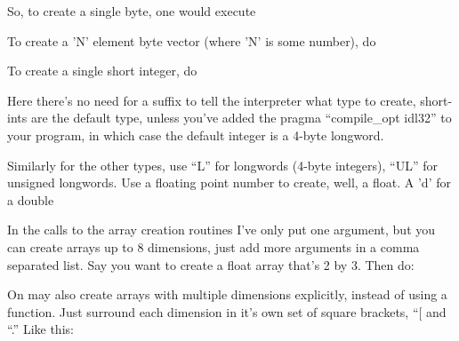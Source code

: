 







  So, to create a single byte, one would execute


  To create a 'N' element byte vector (where 'N' is some number), do


  To create a single short integer, do


  Here there's no need for a suffix to tell the interpreter what type
  to create, short-ints are the default type, unless you've added the
  pragma ``compile_opt idl32'' to your program, in which case the
  default integer is a 4-byte longword.

  Similarly for the other types, use ``L'' for longwords (4-byte
  integers), ``UL'' for unsigned longwords. Use a floating point number
  to create, well, a float. A 'd' for a double

  
  In the calls to the array creation routines I've only put one
  argument, but you can create arrays up to 8 dimensions, just add
  more arguments in a comma separated list. Say you want to create a
  float array that's 2 by 3. Then do:


  
  On may also create arrays with multiple dimensions explicitly,
  instead of using a function. Just surround each dimension in it's
  own set of square brackets, ``[ and ``\].''  Like this:

